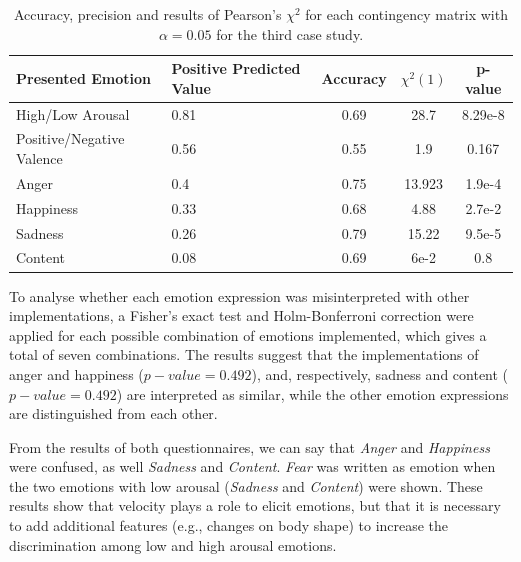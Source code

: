 \begin{table}[h]
	\begin{center}
\small
		\caption{Accuracy, precision and results of Pearson's $\chi^2$ for each contingency matrix with $\alpha = 0.05$ for the third case study.} 
\label{table:Precision}
		\begin{tabular}{|p{3 cm}|p{2 cm}|c|c|c|}
		\hline
		\textbf{Presented Emotion} & \textbf{Positive Predicted Value} & \textbf{Accuracy} & \textbf{$\chi^2(1)$} & \textbf{p-value}\\
		\hline		
		High/Low Arousal & 0.81 & 0.69 & 28.7 & 8.29e-8\\
		\hline
		Positive/Negative Valence & 0.56 & 0.55 & 1.9 & 0.167\\
		\hline
		\hline
		Anger & 0.4 & 0.75&13.923 & 1.9e-4\\
		\hline
		Happiness & 0.33 & 0.68&4.88&2.7e-2\\
		\hline
		Sadness & 0.26 & 0.79&15.22&9.5e-5\\
		\hline
		Content & 0.08 & 0.69&6e-2&0.8 \\		 
		\hline
		\end{tabular}
	\end{center}
\end{table}

To analyse whether each emotion expression was misinterpreted with other implementations, a Fisher's exact test and Holm-Bonferroni correction were applied for each possible combination of emotions implemented, which gives a total of seven combinations.  
The results suggest that the implementations of anger and happiness ($p-value=0.492$), and, respectively, sadness and content ($p-value=0.492$) are interpreted as similar, while the other emotion expressions are distinguished from each other. %

From the results of both questionnaires, we can say that \textit{Anger} and \textit{Happiness} were confused, as well \textit{Sadness} and \textit{Content}. \textit{Fear} was written as emotion when the two emotions with low arousal (\textit{Sadness} and \textit{Content}) were shown. These results show that velocity plays a role to elicit emotions, but that it is necessary to add additional features (e.g., changes on body shape) to increase the discrimination among low and high arousal emotions.


